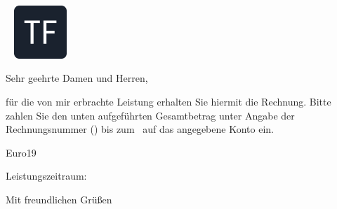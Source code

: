 \documentclass[a4paper]{scrlttr2}
\newcommand{\invoiceSalutation}{Sehr geehrte Damen und Herren,} %
\newcommand{\invoiceText}{für die von mir erbrachte Leistung erhalten Sie hiermit die Rechnung. Bitte zahlen Sie den unten aufgeführten Gesamtbetrag unter Angabe der Rechnungsnummer (\invoiceReference) bis zum \payDate \ auf das angegebene Konto ein.} %
\newcommand{\invoiceEnclosures}{} %
\newcommand{\invoiceClosing}{Mit freundlichen Grüßen}
\begin{document}
	\begin{letter}{
		\ifthenelse{\equal{\customerCompany}{}}{}{\customerCompany \\}
		\customerName \\
		\customerStreet \\
		\customerZIP \
		\customerCity %
	}
		\includegraphics[width=0.15\textwidth]{assets/logo.png}
		\opening{\invoiceSalutation}
		\invoiceText
		\begin{invoice}{Euro}{19}
			\fees
		\end{invoice}
		Leistungszeitraum: \performancePeriod


		\renewcommand*{\raggedsignature}{\raggedright}
		\closing{\invoiceClosing}
		\invoiceEnclosures
	\end{letter}
\end{document}
